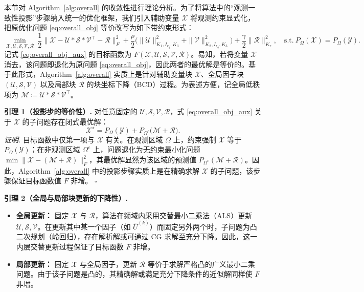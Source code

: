 \documentclass[UTF8]{ctexart}
\begin{document}
本节对 Algorithm~\ref{alg:overall} 的收敛性进行理论分析。为了将算法中的“观测一致性投影”步骤纳入统一的优化框架，我们引入辅助变量 $\mathcal{X}$ 将观测约束显式化，把原优化问题 \eqref{eq:overall_obj} 等价改写为如下带约束形式：
\begin{equation}
\min_{\mathcal{X},\mathcal{U},\mathcal{S},\mathcal{V},\mathcal{R}}
\ \frac{1}{2}\big\|\mathcal{X}-\mathcal{U}*\mathcal{S}*\mathcal{V}^{\top}-\mathcal{R}\big\|_{F}^{2}
+\frac{\rho}{2}\Big(\|\mathcal{U}\|^{2}_{K_1,I_{r_g},K_3}+\|\mathcal{V}\|^{2}_{K_2,I_{r_g},K_3}\Big)
+\frac{\gamma}{2}\|\mathcal{R}\|^{2}_{K_r},
\quad
\mathrm{s.t.}\ P_{\Omega}(\mathcal{X})=P_{\Omega}(\mathcal{Y}).
\label{eq:overall_obj_aux}
\end{equation}
记式 \eqref{eq:overall_obj_aux} 的目标函数为 $F(\mathcal{X},\mathcal{U},\mathcal{S},\mathcal{V},\mathcal{R})$。易知，若将变量 $\mathcal{X}$ 消去，该问题即退化为原问题 \eqref{eq:overall_obj}，因此两者的最优解是等价的。基于此形式，Algorithm~\ref{alg:overall} 实质上是针对辅助变量块 $\mathcal{X}$、全局因子块 $(\mathcal{U},\mathcal{S},\mathcal{V})$ 以及局部块 $\mathcal{R}$ 的块坐标下降（BCD）过程。为表述方便，记全局低秩项为 $\mathcal{M} \coloneqq \mathcal{U}*\mathcal{S}*\mathcal{V}^{\top}$。

\vspace{0.5em}
\noindent\textbf{引理 1（投影步的等价性）.}
对任意固定的 $\mathcal{U},\mathcal{S},\mathcal{V},\mathcal{R}$，式 \eqref{eq:overall_obj_aux} 关于 $\mathcal{X}$ 的子问题存在闭式最优解：
\begin{equation}
\mathcal{X}^{\star}=P_{\Omega}(\mathcal{Y})+P_{\Omega^{c}}\big(\mathcal{M}+\mathcal{R}\big).
\label{eq:x_opt_proj}
\end{equation}
\noindent\textit{证明.} 
目标函数中仅第一项与 $\mathcal{X}$ 有关。在观测区域 $\Omega$ 上，约束强制 $\mathcal{X}$ 等于 $P_{\Omega}(\mathcal{Y})$；在非观测区域 $\Omega^c$ 上，问题退化为无约束最小化问题 $\min \|\mathcal{X}-(\mathcal{M}+\mathcal{R})\|_F^2$，其最优解显然为该区域的预测值 $P_{\Omega^c}(\mathcal{M}+\mathcal{R})$。因此，Algorithm~\ref{alg:overall} 中的投影步骤实质上是在精确求解 $\mathcal{X}$ 的子问题，该步骤保证目标函数值 $F$ 非增。 \hfill$\square$

\vspace{0.5em}
\noindent\textbf{引理 2（全局与局部块更新的下降性）.}
\begin{itemize}
    \item[(1)] \textbf{全局更新：} 固定 $\mathcal{X}$ 与 $\mathcal{R}$，算法在频域内采用交替最小二乘法（ALS）更新 $\mathcal{U},\mathcal{S},\mathcal{V}$。在更新其中某一个因子（如 $\bar{U}^{(k)}$）而固定另外两个时，子问题为凸二次规划（岭回归），存在解析解或可通过 CG 求解至充分下降。因此，这一内层交替更新过程保证了目标函数 $F$ 非增。
    \item[(2)] \textbf{局部更新：} 固定 $\mathcal{X}$ 与全局因子，更新 $\mathcal{R}$ 等价于求解严格凸的广义最小二乘问题。由于该子问题是凸的，其精确解或满足充分下降条件的近似解同样使 $F$ 非增。
\end{itemize}
\end{document}
